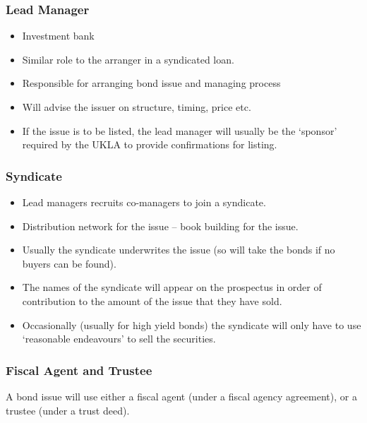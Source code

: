 \documentclass[
]{article}
\providecommand{\tightlist}{%
  \setlength{\itemsep}{0pt}\setlength{\parskip}{0pt}}
\begin{document}
\hypertarget{lead-manager}{%
\subsubsection{Lead Manager}\label{lead-manager}}

\begin{itemize}
\tightlist
\item
  Investment bank
\item
  Similar role to the arranger in a syndicated loan.
\item
  Responsible for arranging bond issue and managing process
\item
  Will advise the issuer on structure, timing, price etc.
\item
  If the issue is to be listed, the lead manager will usually be the
  `sponsor' required by the UKLA to provide confirmations for listing.
\end{itemize}

\hypertarget{syndicate}{%
\subsubsection{Syndicate}\label{syndicate}}

\begin{itemize}
\tightlist
\item
  Lead managers recruits co-managers to join a syndicate.
\item
  Distribution network for the issue -- book building for the issue.
\item
  Usually the syndicate underwrites the issue (so will take the bonds if
  no buyers can be found).
\item
  The names of the syndicate will appear on the prospectus in order of
  contribution to the amount of the issue that they have sold.
\item
  Occasionally (usually for high yield bonds) the syndicate will only
  have to use `reasonable endeavours' to sell the securities.
\end{itemize}

\hypertarget{fiscal-agent-and-trustee}{%
\subsubsection{Fiscal Agent and
Trustee}\label{fiscal-agent-and-trustee}}

A bond issue will use either a fiscal agent (under a fiscal agency
agreement), or a trustee (under a trust deed).
\end{document}
